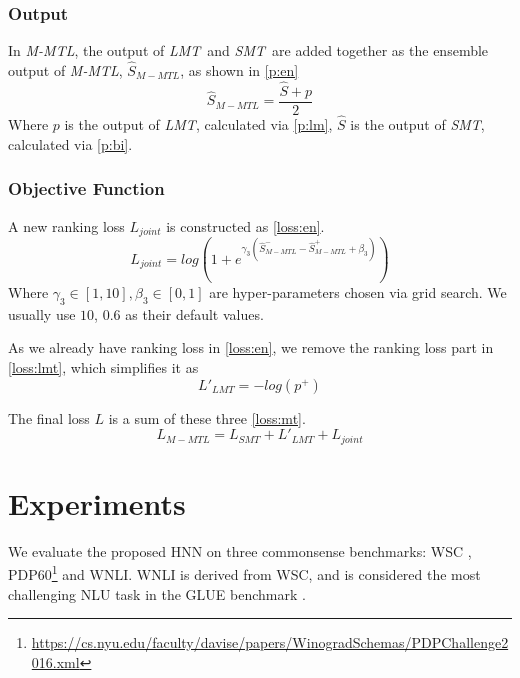 \documentclass[11pt,a4paper]{article}
\newcommand{\lmt}{\textit{LMT}}
\newcommand{\smt}{\textit{SMT}}
\newcommand{\mmt}{\textit{M-MTL}}
\newcommand{\nmodel}{HNN}
\newcommand{\wsc}{WSC}
\begin{document}
\subsubsection{Output}
In \mmt, the output of \lmt~and \smt~are added together as the ensemble output of \mmt, $\hat{S}_{M-MTL}$, as shown in \eqref{p:en}
\begin{equation}
\label{p:en}
    \hat{S}_{M-MTL} = \frac{\hat{S} +  p}{2}
\end{equation}
Where $p$ is the output of \lmt, calculated via \eqref{p:lm}, $\hat{S}$ is the output of \smt, calculated via \eqref{p:bi}.

\subsubsection{Objective Function}
A new ranking loss $L_{joint}$ is constructed as \eqref{loss:en}.
\begin{equation}
\label{loss:en}
    L_{joint} = log\left(1+e^{\gamma_3 \left(\hat{S}^-_{M-MTL}-\hat{S}^+_{M-MTL}+\beta_3 \right)}\right)
\end{equation}
Where $\gamma_3 \in [1,10], \beta_3 \in [0,1]$ are hyper-parameters chosen via grid search. We usually use $10$, $0.6$ as their default values.

As we already have ranking loss in \eqref{loss:en}, we remove the ranking loss part in \eqref{loss:lmt}, which simplifies it as 
\begin{equation}
    \label{loss:lmt-m}
    L'_{LMT} = -log\left(p^+\right)
\end{equation}

The final loss $L$ is a sum of these three \eqref{loss:mt}.
\begin{equation}
    L_{M-MTL} = L_{SMT} + L'_{LMT} + L_{joint}
    \label{loss:mt}
\end{equation}



\fi 


\section{Experiments}
\label{sec:exp}
We evaluate the proposed {\nmodel} on three commonsense benchmarks: {\wsc} \cite{winograd2012}, PDP60\footnote{\url{https://cs.nyu.edu/faculty/davise/papers/WinogradSchemas/PDPChallenge2016.xml}} and WNLI. 
WNLI is derived from WSC, and is considered the most challenging NLU task in the GLUE benchmark \cite{wang2018glue}.
\end{document}
